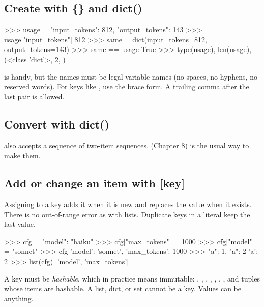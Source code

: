 \subsection{Create with \{\} and dict()}

\begin{pycode}
>>> usage = {"input_tokens": 812, "output_tokens": 143}
>>> usage["input_tokens"]
812
>>> same = dict(input_tokens=812, output_tokens=143)
>>> same == usage
True
>>> type(usage), len(usage), {}
(<class 'dict'>, 2, {})
\end{pycode}

 is handy, but the names must be legal variable names (no spaces, no hyphens, no
reserved words). For keys like , use the brace form. A trailing comma after the last
pair is allowed.

\subsection{Convert with dict()}

 also accepts a sequence of two-item sequences.  (Chapter 8) is the usual way to
make them.


\subsection{Add or change an item with [key]}

Assigning to a key adds it when it is new and replaces the value when it exists. There is no
out-of-range error as with lists. Duplicate keys in a literal keep the last value.

\begin{pycode}
>>> cfg = {"model": "haiku"}
>>> cfg["max_tokens"] = 1000
>>> cfg["model"] = "sonnet"
>>> cfg
{'model': 'sonnet', 'max_tokens': 1000}
>>> {"a": 1, "a": 2}
{'a': 2}
>>> list(cfg)
['model', 'max_tokens']
\end{pycode}

\begin{typecheck}
A key must be \emph{hashable}, which in practice means immutable: , , ,
, , , , and tuples whose items are hashable. A list, dict,
or set cannot be a key. Values can be anything.
\end{typecheck}

